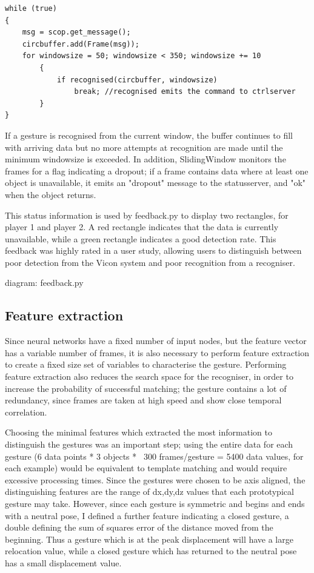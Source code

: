 \documentclass[12pt,a4,notitlepage]{report}
\renewcommand{\_}{\texttt{\symbol{95}}}
\newcommand{\<}{\texttt{\symbol{60}}}
\renewcommand{\>}{\texttt{\symbol{62}}}
\begin{document}
\begin{verbatim}
while (true)
{
	msg = scop.get_message();
	circbuffer.add(Frame(msg));
	for windowsize = 50; windowsize < 350; windowsize += 10
		{
			if recognised(circbuffer, windowsize)
				break; //recognised emits the command to ctrlserver
		}
}
\end{verbatim}

If a gesture is recognised from the current window, the buffer continues to fill with arriving data but no more attempts at recognition are made until the minimum windowsize is exceeded. In addition, SlidingWindow monitors the frames for a flag indicating a dropout; if a frame contains data where at least one object is unavailable, it emits an "dropout" message to the statusserver, and "ok" when the object returns.

This status information is used by feedback.py to display two rectangles, for player 1 and player 2. A red rectangle indicates that the data is currently unavailable, while a green rectangle indicates a good detection rate. This feedback was highly rated in a user study, allowing users to distinguish between poor detection from the Vicon system and poor recognition from a recogniser.

{diagram: feedback.py}

\subsection{Feature extraction}

Since neural networks have a fixed number of input nodes, but the feature vector has a variable number of frames, it is also necessary to perform feature extraction to create a fixed size set of variables to characterise the gesture. Performing feature extraction also reduces the search space for the recogniser, in order to increase the probability of successful matching; the gesture contains a lot of redundancy, since frames are taken at high speed and show close temporal correlation.

Choosing the minimal features which extracted the most information to distinguish the gestures was an important step; using the entire data for each gesture (6 data points * 3 objects * ~300 frames/gesture = 5400 data values, for each example) would be equivalent to template matching and would require excessive processing times. Since the gestures were chosen to be axis aligned, the distinguishing features are the range of dx,dy,dz values that each prototypical gesture may take. However, since each gesture is symmetric and begins and ends with a neutral pose, I defined a further feature indicating a closed gesture, a double defining the sum of squares error of the distance moved from the beginning. Thus a gesture which is at the peak displacement will have a large relocation value, while a closed gesture which has returned to the neutral pose has a small displacement value.
\end{document}
